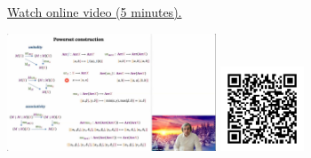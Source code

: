 
\begin{minipage}{10cm}
    \href{https://act4e-spring21.netlify.app/videos/spring2021-monads-a:monad-interval.html}{Watch online video (5 minutes).}
        
    \href{https://act4e-spring21.netlify.app/videos/spring2021-monads-a:monad-interval.html}{\includegraphics[height=3.5cm]{spring2021-monads-a:monad-interval/thumbnails.jpg}}
    \href{https://act4e-spring21.netlify.app/videos/spring2021-monads-a:monad-interval.html}{\includegraphics[height=2.5cm]{spring2021-monads-a:monad-interval/qrcode.png}}
\end{minipage}
